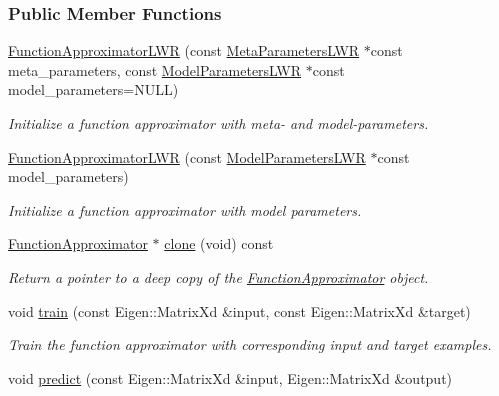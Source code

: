 \subsubsection*{Public Member Functions}
\begin{DoxyCompactItemize}
\item 
\hyperlink{classDmpBbo_1_1FunctionApproximatorLWR_a614a73ce1a2298ddd81fe529dfd6ed91}{Function\+Approximator\+L\+W\+R} (const \hyperlink{classDmpBbo_1_1MetaParametersLWR}{Meta\+Parameters\+L\+W\+R} $\ast$const meta\+\_\+parameters, const \hyperlink{classDmpBbo_1_1ModelParametersLWR}{Model\+Parameters\+L\+W\+R} $\ast$const model\+\_\+parameters=N\+U\+L\+L)
\begin{DoxyCompactList}\small\item\em Initialize a function approximator with meta-\/ and model-\/parameters. \end{DoxyCompactList}\item 
\hyperlink{classDmpBbo_1_1FunctionApproximatorLWR_aa2906d5457be398fbd1392fb623c9f3c}{Function\+Approximator\+L\+W\+R} (const \hyperlink{classDmpBbo_1_1ModelParametersLWR}{Model\+Parameters\+L\+W\+R} $\ast$const model\+\_\+parameters)
\begin{DoxyCompactList}\small\item\em Initialize a function approximator with model parameters. \end{DoxyCompactList}\item 
\hyperlink{classDmpBbo_1_1FunctionApproximator}{Function\+Approximator} $\ast$ \hyperlink{classDmpBbo_1_1FunctionApproximatorLWR_ad792a46ac006916c5c1ffed2fa42dd24}{clone} (void) const 
\begin{DoxyCompactList}\small\item\em Return a pointer to a deep copy of the \hyperlink{classDmpBbo_1_1FunctionApproximator}{Function\+Approximator} object. \end{DoxyCompactList}\item 
void \hyperlink{classDmpBbo_1_1FunctionApproximatorLWR_ac453415cf4894aba45e8db6ebc4cd4dc}{train} (const Eigen\+::\+Matrix\+Xd \&input, const Eigen\+::\+Matrix\+Xd \&target)
\begin{DoxyCompactList}\small\item\em Train the function approximator with corresponding input and target examples. \end{DoxyCompactList}\item 
void \hyperlink{classDmpBbo_1_1FunctionApproximatorLWR_afe8dcfb9cd065dfde38dce1f6e6cd3e6}{predict} (const Eigen\+::\+Matrix\+Xd \&input, Eigen\+::\+Matrix\+Xd \&output)

\end{DoxyCompactItemize}
